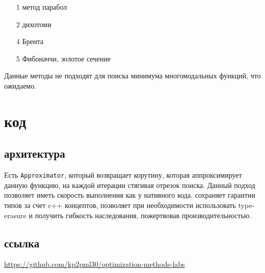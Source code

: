 \documentclass[russian, english]{article}
\def\code#1{\texttt{#1}}
\begin{document}
\begin{itemize}
	\item[1] метод парабол
	\item[2] дихотоми
	\item[4] Брента
	\item[5] Фибоначчи, золотое сечение
\end{itemize}
\par
Данные методы не подходят для поиска минимума многомодальных функций, что ожидаемо.

\newpage
\appendix
\section{код}
\subsection{архитектура}
Есть \code{Approximator}, который возвращает корутину, которая аппроксимирует данную функцию, на каждой итерации стягивая отрезок поиска. Данный подход позволяет иметь скорость выполнения как у нативного кода, сохраняет гарантии типов за счет c++ концептов, позволяет при необходимости использовать type-erasure и получить гибкость наследования, пожертвовав производительностью.

\subsection{ссылка}
\url{https://github.com/kp2pml30/optimization-methods-labs}
\end{document}
